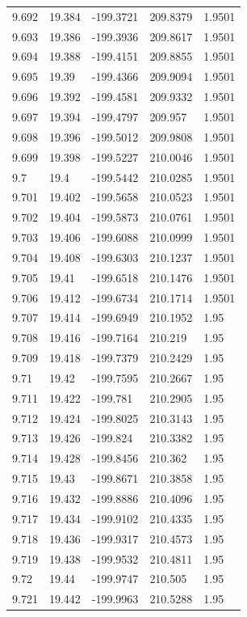 \begin{tabular}{lllll}
9.692 & 19.384 & -199.3721 & 209.8379 & 1.9501 \\
9.693 & 19.386 & -199.3936 & 209.8617 & 1.9501 \\
9.694 & 19.388 & -199.4151 & 209.8855 & 1.9501 \\
9.695 & 19.39 & -199.4366 & 209.9094 & 1.9501 \\
9.696 & 19.392 & -199.4581 & 209.9332 & 1.9501 \\
9.697 & 19.394 & -199.4797 & 209.957 & 1.9501 \\
9.698 & 19.396 & -199.5012 & 209.9808 & 1.9501 \\
9.699 & 19.398 & -199.5227 & 210.0046 & 1.9501 \\
9.7 & 19.4 & -199.5442 & 210.0285 & 1.9501 \\
9.701 & 19.402 & -199.5658 & 210.0523 & 1.9501 \\
9.702 & 19.404 & -199.5873 & 210.0761 & 1.9501 \\
9.703 & 19.406 & -199.6088 & 210.0999 & 1.9501 \\
9.704 & 19.408 & -199.6303 & 210.1237 & 1.9501 \\
9.705 & 19.41 & -199.6518 & 210.1476 & 1.9501 \\
9.706 & 19.412 & -199.6734 & 210.1714 & 1.9501 \\
9.707 & 19.414 & -199.6949 & 210.1952 & 1.95 \\
9.708 & 19.416 & -199.7164 & 210.219 & 1.95 \\
9.709 & 19.418 & -199.7379 & 210.2429 & 1.95 \\
9.71 & 19.42 & -199.7595 & 210.2667 & 1.95 \\
9.711 & 19.422 & -199.781 & 210.2905 & 1.95 \\
9.712 & 19.424 & -199.8025 & 210.3143 & 1.95 \\
9.713 & 19.426 & -199.824 & 210.3382 & 1.95 \\
9.714 & 19.428 & -199.8456 & 210.362 & 1.95 \\
9.715 & 19.43 & -199.8671 & 210.3858 & 1.95 \\
9.716 & 19.432 & -199.8886 & 210.4096 & 1.95 \\
9.717 & 19.434 & -199.9102 & 210.4335 & 1.95 \\
9.718 & 19.436 & -199.9317 & 210.4573 & 1.95 \\
9.719 & 19.438 & -199.9532 & 210.4811 & 1.95 \\
9.72 & 19.44 & -199.9747 & 210.505 & 1.95 \\
9.721 & 19.442 & -199.9963 & 210.5288 & 1.95 \\

\end{tabular}

